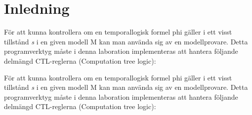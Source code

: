 \section{Inledning}
För att kunna kontrollera om en temporallogisk formel phi gäller i ett visst tillstånd \textit{s} i en given modell M kan man använda sig
av en modellprovare. Detta programverktyg måste i denna laboration implementeras att hantera följande delmängd CTL-reglerna (Computation tree
logic):

För att kunna kontrollera om en temporallogisk formel phi gäller i ett visst tillstånd \textit{s} i en given modell M kan man använda sig 
av en modellprovare. Detta programverktyg måste i denna laboration implementeras att hantera följande delmängd CTL-reglerna (Computation tree 
logic):